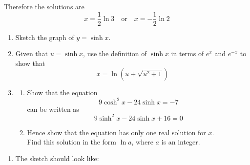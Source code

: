 \documentclass[leqno]{article}
\begin{document}
\begin{enumerate}[
  label=\textbf{\arabic*.},
  leftmargin=*,
  topsep=0pt,
  partopsep=0pt,
  parsep=0pt
]
\begin{djsSolution}
\begin{enumerate}[label=\textbf{(\alph*)}]
Therefore the solutions are
\[
x=\frac12\ln 3 \quad \text{or} \quad x=-\frac12\ln 2
\]
\end{enumerate}
\end{djsSolution}


\newpage

\questionitem

\begin{enumerate}[label=\textbf{(\alph*)}]
  \item Sketch the graph of $y = \sinh x$.  \\
  \item Given that $u = \sinh x$, use the definition of $\sinh x$ in terms of $e^x$ and $e^{-x}$ to show that
  \[
  x = \ln\left(u + \sqrt{u^2+1}\right)
  \]
  \item
  \begin{enumerate}[label=(\roman*)]
    \item Show that the equation
    \[
    9\cosh^2 x - 24\sinh x = -7
    \]
    can be written as
    \[
    9\sinh^2 x - 24\sinh x + 16 = 0
    \]
    \item Hence show that the equation has only one real solution for $x$. \\

    Find this solution in the form $\ln a$, where $a$ is an integer.  \\
  \end{enumerate}
\end{enumerate}

\vspace*{10pt}

\begin{djsSolution}
\begin{enumerate}[label=\textbf{(\alph*)}]
  \item The sketch should look like:\par\nopagebreak



\end{enumerate}
\end{djsSolution}
\end{enumerate}
\end{document}
